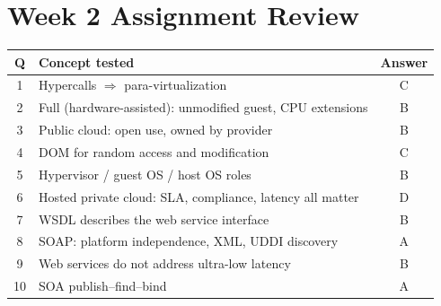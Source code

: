 \section{Week 2 Assignment Review}
\begin{center}
\begin{tabularx}{\textwidth}{cXc}
\toprule
Q & Concept tested & Answer\\
\midrule
1 & Hypercalls $\Rightarrow$ para-virtualization & C\\
2 & Full (hardware-assisted): unmodified guest, CPU extensions & B\\
3 & Public cloud: open use, owned by provider & B\\
4 & DOM for random access and modification & C\\
5 & Hypervisor / guest OS / host OS roles & B\\
6 & Hosted private cloud: SLA, compliance, latency all matter & D\\
7 & WSDL describes the web service interface & B\\
8 & SOAP: platform independence, XML, UDDI discovery & A\\
9 & Web services do not address ultra-low latency & B\\
10 & SOA publish--find--bind & A\\
\bottomrule
\end{tabularx}
\end{center}
